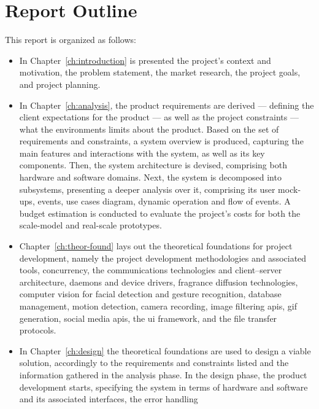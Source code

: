 \section{Report Outline}%
\label{sec:report-outline}
This report is organized as follows:
\begin{itemize}
\item In Chapter~\ref{ch:introduction} is presented the project's context and
  motivation, the problem statement, the market research, the project goals, and
  project planning.
\item In Chapter~\ref{ch:analysis}, the product requirements are derived --- defining the client expectations
for the product --- as well as the project constraints --- what the environments
limits about the product. Based on the set of requirements and constraints, a
system overview is produced, capturing the main features and interactions with
the system, as well as its key components.
Then, the system architecture is
devised, comprising both hardware and software domains. Next, the system is
decomposed into subsystems, presenting a deeper analysis over it, comprising its
user mock-ups, events, use cases diagram, dynamic operation and flow of
events. A budget estimation is conducted to evaluate the project's costs for
both the scale-model and real-scale prototypes.
\item Chapter~\ref{ch:theor-found} lays out the theoretical foundations for
project development, namely the project development methodologies and associated
tools, concurrency, the communications technologies and client--server
architecture, daemons and device drivers, fragrance diffusion technologies,
computer vision for facial detection and gesture recognition, database
management, motion detection, camera recording, image filtering \gls{api}s,
\gls{gif} generation, social media \gls{api}s, the \gls{ui} framework, and the
file transfer protocols. 
\item In Chapter~\ref{ch:design} the theoretical foundations are used to design
  a viable solution, accordingly to the requirements and constraints listed and
  the information gathered in the analysis phase.
In the design phase, the product development starts, specifying the system in
terms of hardware and software and its associated interfaces, the error handling

\end{itemize}
